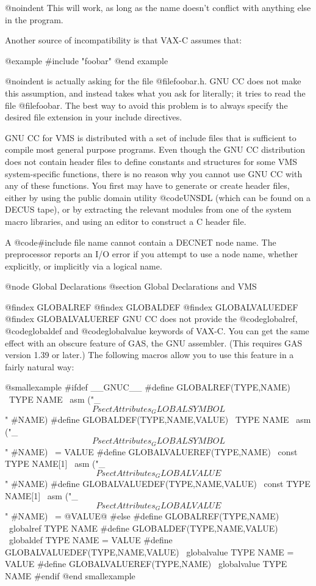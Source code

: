 @noindent
This will work, as long as the name doesn't conflict with anything else
in the program.

Another source of incompatibility is that VAX-C assumes that:

@example
#include "foobar"
@end example

@noindent
is actually asking for the file @file{foobar.h}.  GNU CC does not
make this assumption, and instead takes what you ask for literally;
it tries to read the file @file{foobar}.  The best way to avoid this
problem is to always specify the desired file extension in your include
directives.

GNU CC for VMS is distributed with a set of include files that is
sufficient to compile most general purpose programs.  Even though the
GNU CC distribution does not contain header files to define constants
and structures for some VMS system-specific functions, there is no
reason why you cannot use GNU CC with any of these functions.  You first
may have to generate or create header files, either by using the public
domain utility @code{UNSDL} (which can be found on a DECUS tape), or by
extracting the relevant modules from one of the system macro libraries,
and using an editor to construct a C header file.

A @code{#include} file name cannot contain a DECNET node name.  The
preprocessor reports an I/O error if you attempt to use a node name,
whether explicitly, or implicitly via a logical name.

@node Global Declarations
@section Global Declarations and VMS

@findex GLOBALREF
@findex GLOBALDEF
@findex GLOBALVALUEDEF
@findex GLOBALVALUEREF
GNU CC does not provide the @code{globalref}, @code{globaldef} and
@code{globalvalue} keywords of VAX-C.  You can get the same effect with
an obscure feature of GAS, the GNU assembler.  (This requires GAS
version 1.39 or later.)  The following macros allow you to use this
feature in a fairly natural way:

@smallexample
#ifdef __GNUC__
#define GLOBALREF(TYPE,NAME)                      \
  TYPE NAME                                       \
  asm ("_$$PsectAttributes_GLOBALSYMBOL$$" #NAME)
#define GLOBALDEF(TYPE,NAME,VALUE)                \
  TYPE NAME                                       \
  asm ("_$$PsectAttributes_GLOBALSYMBOL$$" #NAME) \
    = VALUE
#define GLOBALVALUEREF(TYPE,NAME)                 \
  const TYPE NAME[1]                              \     
  asm ("_$$PsectAttributes_GLOBALVALUE$$" #NAME)
#define GLOBALVALUEDEF(TYPE,NAME,VALUE)           \
  const TYPE NAME[1]                              \
  asm ("_$$PsectAttributes_GLOBALVALUE$$" #NAME)  \
    = @{VALUE@}
#else
#define GLOBALREF(TYPE,NAME) \
  globalref TYPE NAME
#define GLOBALDEF(TYPE,NAME,VALUE) \
  globaldef TYPE NAME = VALUE
#define GLOBALVALUEDEF(TYPE,NAME,VALUE) \
  globalvalue TYPE NAME = VALUE
#define GLOBALVALUEREF(TYPE,NAME) \
  globalvalue TYPE NAME
#endif
@end smallexample

